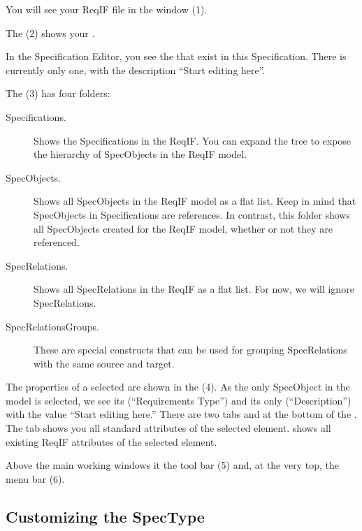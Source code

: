 You will see your ReqIF file in the  window (1).

The  (2) shows your .

In the Specification Editor, you see the  that exist in this Specification.  There is currently only one, with the description ``Start editing here''.

The  (3) has four folders:

\begin{description}
\item[Specifications.] Shows the Specifications in the ReqIF.  You can expand the tree to expose the hierarchy of SpecObjects in the ReqIF model.
\item[SpecObjects.] Shows all SpecObjects in the ReqIF model as a flat list.  Keep in mind that SpecObjects in Specifications are references.  In contrast, this folder shows all SpecObjects created for the ReqIF model, whether or not they are referenced.
\item[SpecRelations.] Shows all SpecRelations in the ReqIF as a flat list.  For now, we will ignore SpecRelations.
\item[SpecRelationsGroups.] These are special constructs that can be used for grouping SpecRelations with the same source and target.
\end{description}

The properties of a selected  are shown in the  (4).  As the only SpecObject in the model is selected, we see its  (``Requirements Type'') and its only  (``Description'') with the value ``Start editing here.''  There are two tabs  and  at the bottom of the .  The  tab shows you all standard attributes of the selected element.   shows all existing ReqIF attributes of the selected element.

Above the main working windows it the tool bar (5) and, at the very top, the menu bar (6).

\subsection{Customizing the SpecType}

